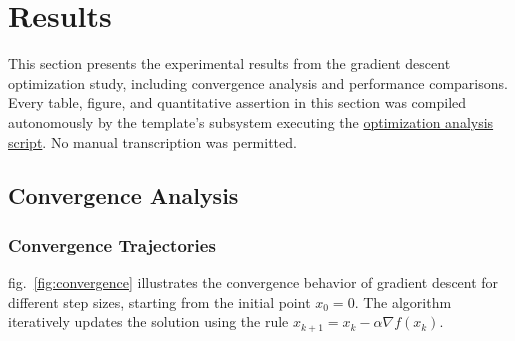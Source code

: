 \documentclass[
  english,
]{article}
\begin{document}
\newpage

\section{Results}\label{sec:results}

This section presents the experimental results from the gradient descent
optimization study, including convergence analysis and performance
comparisons. Every table, figure, and quantitative assertion in this
section was compiled autonomously by the template's
 subsystem executing the
\href{https://github.com/docxology/template/blob/main/projects/templates/template_code_project/scripts/optimization_analysis.py}{optimization
analysis script}. No manual transcription was permitted.

\subsection{Convergence Analysis}\label{convergence-analysis-1}

\subsubsection{Convergence Trajectories}\label{convergence-trajectories}

fig.~\ref{fig:convergence} illustrates the convergence behavior of
gradient descent for different step sizes, starting from the initial
point \(x_0 = 0\). The algorithm iteratively updates the solution using
the rule \(x_{k+1} = x_k - \alpha \nabla f(x_k)\).
\end{document}
